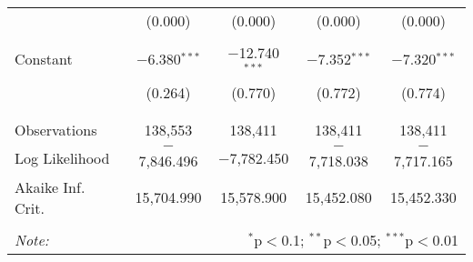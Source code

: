 \begin{table}[!htbp]
\begin{tabular}{@{\extracolsep{-5pt}}lcccc}
  & (0.000) & (0.000) & (0.000) & (0.000) \\ 
  & & & & \\ 
 Constant & $-$6.380$^{***}$ & $-$12.740$^{***}$ & $-$7.352$^{***}$ & $-$7.320$^{***}$ \\ 
  & (0.264) & (0.770) & (0.772) & (0.774) \\ 
  & & & & \\ 
\hline \\[-1.8ex] 
Observations & 138,553 & 138,411 & 138,411 & 138,411 \\ 
Log Likelihood & $-$7,846.496 & $-$7,782.450 & $-$7,718.038 & $-$7,717.165 \\ 
Akaike Inf. Crit. & 15,704.990 & 15,578.900 & 15,452.080 & 15,452.330 \\ 
\hline 
\hline \\[-1.8ex] 
\textit{Note:}  & \multicolumn{4}{r}{$^{*}$p$<$0.1; $^{**}$p$<$0.05; $^{***}$p$<$0.01} \\ 
\end{tabular} 
\end{table} 
